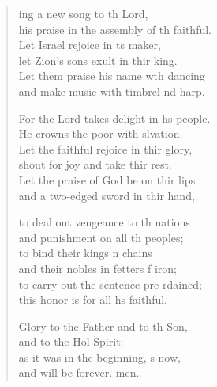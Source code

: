\settowidth{\versewidth}{his praise in the assembly of the faithful.}
\begin{verse}%
  \begin{patverse}
    ing a new song to th Lord,\Med\\
his praise in the assembly of th faithful.\\
Let Israel rejoice in \pointup{\i}ts maker,\Med\\
let Zion’s sons exult in thir king.\\
Let them praise his name w\pointup{\i}th dancing\Med\\
and make music with timbrel nd harp.

For the Lord takes delight in h\pointup{\i}s people.\Med\\
He crowns the poor with slvation.\\
Let the faithful rejoice in thir glory,\Med\\
shout for joy and take thir rest.\\
Let the praise of God be on thir lips\Med\\
and a two-edged sword in thir hand,

to deal out vengeance to th nations\Med\\
and punishment on all th peoples;\\
to bind their kings \pointup{\i}n chains\Med\\
and their nobles in fetters f iron;\\
to carry out the sentence pre-rdained;\Med\\
this honor is for all h\pointup{\i}s faithful.

Glory to the Father and to th Son,\Med\\
and to the Hol Spirit:\\
as it was in the beginning, \pointup{\i}s now,\Med\\
and will be forever. men.
  \end{patverse}
\end{verse}
